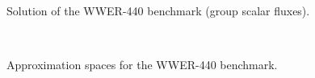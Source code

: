 \begin{figure}[!ht]
\centering
{}
\\[1em]
  \caption[Solution of the WWER-440 benchmark]{Solution of the WWER-440 benchmark (group scalar fluxes).}
  \label{fig:61}
\end{figure}
\begin{figure}[!hb]
\centering
{}
\\[.5em]
  \caption[Approximation spaces in the WWER-440 benchmark]{Approximation spaces for the WWER-440 benchmark.}
  \label{fig:62}
\end{figure}

